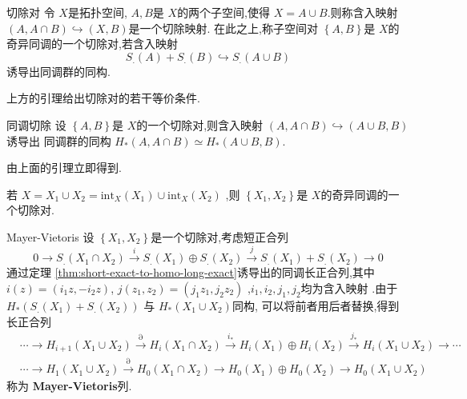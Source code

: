 \documentclass[../../几何与拓扑.tex]{subfiles}
\begin{document}
\begin{definition}{切除对}
    令 \(  X  \)是拓扑空间, \(  A,B  \)是 \(  X  \)的两个子空间,使得 \(  X =  A\cup B  \).则称含入映射 \(  \left( A,A\cap B \right) \hookrightarrow \left( X,B \right)    \)是一个切除映射.
    在此之上,称子空间对 \(  \left\{ A,B \right\}  \)是 \(  X  \)的奇异同调的一个切除对,若含入映射 \[
    S_{.}\left( A \right)+ S_{.}\left( B \right) \hookrightarrow S_{.}\left( A\cup B \right)   
    \]诱导出同调群的同构.       
\end{definition}

\begin{remark}
    上方的引理给出切除对的若干等价条件.
\end{remark}

\begin{theorem}{同调切除}
    设 \(  \left\{ A,B \right\}  \)是 \(  X  \)的一个切除对,则含入映射 \(  \left( A,A\cap B \right)\hookrightarrow \left( A\cup B ,B\right)    \)诱导出
    同调群的同构 \(  H_{*}\left( A,A\cap B \right)\simeq H_{*}\left( A\cup B,B \right)    \).   
\end{theorem}

\begin{remark}
    由上面的引理立即得到.
\end{remark}

\begin{theorem}
    若 \(  X =  X_1\cup X_2= \mathrm{int}_{X}\left( X_1 \right)\cup \mathrm{int}_{X}\left( X_2 \right)    \) ,则 \(  \left\{ X_1,X_2 \right\}  \)是 \(  X  \)的奇异同调的一个切除对.  
\end{theorem}

\begin{definition}{Mayer-Vietoris}
    设 \(  \left\{ X_1,X_2 \right\}  \)是一个切除对,考虑短正合列\[
        0\to S_.(X_1\cap X_2)\xrightarrow{i} S_.(X_1)\oplus S_.(X_2)\xrightarrow{j} S_.(X_1)+S_.(X_2)\to0
    \]通过定理 \ref{thm:short-exact-to-homo-long-exact}诱导出的同调长正合列,其中 \(  i \left( z \right)= \left(i_1z,-i_2z \right)   \), \(  j\left(  z_1,z_2\right)= \left( j_1z_1,j_2z_2 \right)    \) ,\(  i_1,i_2,j_1,j_2  \)均为含入映射 .由于 \(  H_{*}\left( S_{.}\left( X_1 \right)+ S_{.}\left( X_2 \right)   \right)   \) 与
     \(  H_{*}\left( X_1\cup X_2 \right)   \)同构, 可以将前者用后者替换,得到长正合列 \[
        \begin{aligned}&\cdots\to H_{i+1}(X_1\cup X_2)\overset{\partial}{\operatorname*{\to}}H_i(X_1\cap X_2)\overset{i_*}{\operatorname*{\to}}H_i(X_1)\oplus H_i(X_2)\overset{j_*}{\operatorname*{\to}}H_i(X_1\cup X_2)\to\cdots\\&\cdots\to H_1(X_1\cup X_2)\overset{\partial}{\operatorname*{\to}}H_0(X_1\cap X_2)\to H_0(X_1)\oplus H_0(X_2)\to H_0(X_1\cup X_2)\end{aligned}
     \]称为 \textbf{Mayer-Vietoris}列. 
\end{definition}
\end{document}
